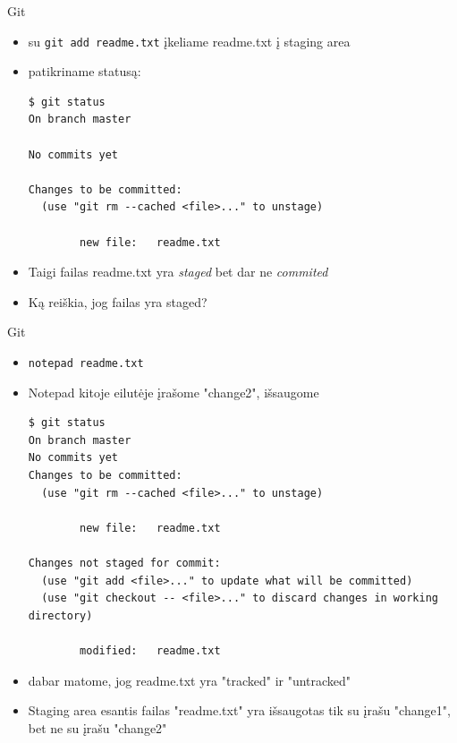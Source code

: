 \documentclass[11pt,xcolor=table]{beamer}
\begin{document}
\begin{frame}[fragile]{Git}
\begin{itemize}
\item su \colorbox{listinggray}{\lstinline|git add readme.txt|} įkeliame readme.txt į staging area
\item patikriname statusą:
\begin{lstlisting}
$ git status
On branch master

No commits yet

Changes to be committed:
  (use "git rm --cached <file>..." to unstage)

        new file:   readme.txt

\end{lstlisting}
\item Taigi failas readme.txt yra \textit{staged} bet dar ne \textit{commited}
\item Ką reiškia, jog failas yra staged?
\end{itemize}
\end{frame}


\begin{frame}[fragile]{Git}
\begin{itemize}
\item \colorbox{listinggray}{\lstinline|notepad readme.txt|}
\item Notepad kitoje eilutėje įrašome "change2", išsaugome
\begin{lstlisting}
$ git status
On branch master
No commits yet
Changes to be committed:
  (use "git rm --cached <file>..." to unstage)

        new file:   readme.txt

Changes not staged for commit:
  (use "git add <file>..." to update what will be committed)
  (use "git checkout -- <file>..." to discard changes in working directory)

        modified:   readme.txt
\end{lstlisting}
\item dabar matome, jog readme.txt yra "tracked" ir "untracked"
\item Staging area esantis failas "readme.txt" yra išsaugotas tik su įrašu "change1", bet ne su įrašu "change2"
\end{itemize}
\end{frame}
\end{document}
